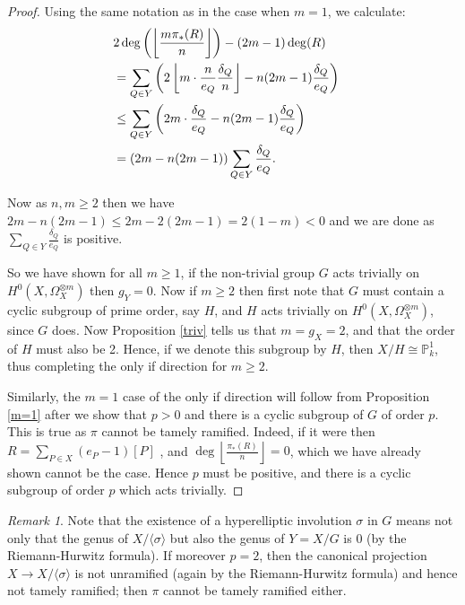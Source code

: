 \documentclass[draft, 11pt]{article} %
\theoremstyle{plain}
\theoremstyle{remark}
\newtheorem*{rem}{Remark}
\begin{document}
\begin{proof}
    Using the same notation as in the case when $m=1$, we calculate:
      \begin{align*}
	\lefteqn{2\deg\left(\left\lfloor\frac{m\pi_*(R)}{n}\right\rfloor\right)-(2m-1)\deg(R)}\\
	& = \sum_{Q \in Y} \left(2\left\lfloor m\cdot \frac{n}{e_Q}\frac{\delta_Q}{n}\right\rfloor -n(2m-1)\frac{\delta_Q}{e_Q}\right) \\
	&\leq   \sum_{Q\in Y}\left( 2m\cdot\frac{\delta_Q}{e_Q}-n(2m-1)\frac{\delta_Q}{e_Q}\right) \\
	& =  (2m-n(2m-1))\sum_{Q\in Y }\frac{\delta_Q}{e_Q}.
      \end{align*}

    Now as $n,m\geq 2$ then we have $2m-n(2m-1)\leq 2m-2(2m-1)=2(1-m)<0$ and we are done as $\sum_{Q\in Y}\frac{\delta_Q}{e_Q}$ is positive.

    So we have shown for all $m\geq 1$, if the non-trivial group $G$ acts trivially  on $H^0(X,\Omega_X^{\otimes m})$ then $g_Y=0$.
    Now if $m\geq 2$ then first note that $G$ must contain a cyclic subgroup of prime order, say $H$, and $H$ acts trivially on $H^0(X,\Omega_X^{\otimes m})$, since $G$ does.
    Now Proposition \ref{triv} tells us that $m=g_X=2$, and that the order of $H$ must also be 2.
    Hence, if we denote this subgroup by $H$, then $X/H\cong \mathbb{P}_k^1$, thus completing the only if direction for $m\geq 2$.
    
    Similarly, the $m=1$ case of the only if direction will follow from Proposition \ref{m=1} after we show that $p>0$ and there is a cyclic subgroup of $G$ of order $p$. 
    This is true as $\pi$ cannot be tamely ramified.
    Indeed, if it were then $R=\sum_{P\in X} (e_P-1)[P]$ \cite[Cor 2.4,Ch IV]{hart}, and $\deg\left\lfloor \frac{\pi_*(R)}{n} \right\rfloor=0$, which we have already shown cannot be the case.
    Hence $p$ must be positive, and there is a cyclic subgroup of order $p$ which acts trivially.
  \end{proof}

\begin{rem}
  Note that the existence of a hyperelliptic involution $\sigma$ in $G$ means not only that the genus of $X/\langle \sigma \rangle$ but also the genus of $Y=X/G$ is $0$ (by the Riemann-Hurwitz formula).
  If moreover $p=2$, then the canonical projection $X\rightarrow X/\langle \sigma \rangle$ is not unramified (again by the Riemann-Hurwitz formula) and hence not tamely ramified; then $\pi$ cannot be tamely ramified either.
\end{rem}
\end{document}
